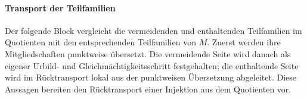 \documentclass[main.tex]{subfiles}
\begin{document}
\begin{tabproof}
\end{tabproof}

\begin{tabproof}
\end{tabproof}

\paragraph{Transport der Teilfamilien}

Der folgende Block vergleicht die vermeidenden und enthaltenden Teilfamilien im
Quotienten mit den entsprechenden Teilfamilien von \(M\). Zuerst werden ihre
Mitgliedschaften punktweise übersetzt. Die vermeidende Seite wird danach als
eigener Urbild- und Gleichmächtigkeitsschritt festgehalten; die enthaltende
Seite wird im Rücktransport lokal aus der punktweisen Übersetzung abgeleitet.
Diese Aussagen bereiten den Rücktransport einer Injektion aus dem Quotienten
vor.
\end{document}
